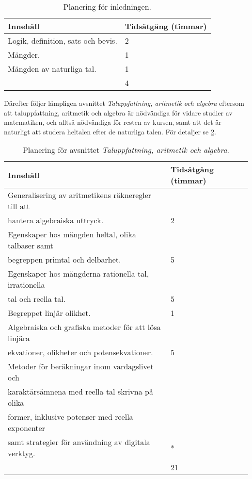\begin{table}
  \caption{%
    Planering för inledningen.
  }\label{tbl:inledning}
  \begin{tabular}{ll}
    Innehåll & Tidsåtgång (timmar) \\
    \toprule
    Logik, definition, sats och bevis. & 2 \\
    \midrule
    Mängder. & 1 \\
    \midrule
    Mängden av naturliga tal. & 1 \\
    \bottomrule
    & 4 \\
  \end{tabular}
\end{table}

Därefter följer lämpligen avsnittet \emph{Taluppfattning, aritmetik
och algebra} eftersom att taluppfattning, aritmetik och algebra är nödvändiga
för vidare studier av matematiken, och alltså nödvändiga för resten av kursen,
samt att det är naturligt att studera heltalen efter de naturliga talen.
För detaljer se \cref{tbl:talteori}.

\begin{table}
  \caption{%
    Planering för avsnittet \emph{Taluppfattning, aritmetik och
    algebra}.
  }\label{tbl:talteori}
  \begin{tabular}{ll}
    Innehåll & Tidsåtgång (timmar) \\
    \toprule
    Generalisering av aritmetikens räkneregler till att\\
      hantera algebraiska uttryck. & 2 \\
    \midrule
    Egenskaper hos mängden heltal, olika talbaser samt\\
      begreppen primtal och delbarhet. & 5 \\
    \midrule
    Egenskaper hos mängderna rationella tal, irrationella\\
      tal och reella tal. & 5 \\
    \midrule
    Begreppet linjär olikhet. & 1 \\
    \midrule
    Algebraiska och grafiska metoder för att lösa linjära\\
      ekvationer, olikheter och potensekvationer. & 5 \\
    \midrule
    Metoder för beräkningar inom vardagslivet och\\
      karaktärsämnena med reella tal skrivna på olika\\
      former, inklusive potenser med reella exponenter\\
      samt strategier för användning av digitala verktyg.
      & * \\
    \bottomrule
    & 21 \\
  \end{tabular}
\end{table}

